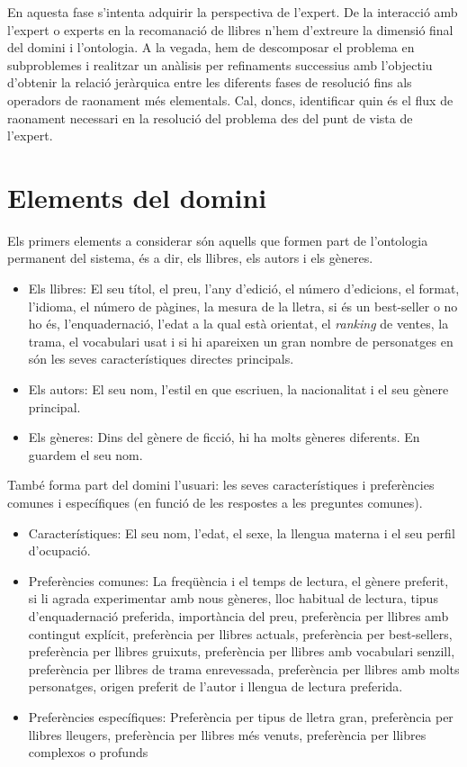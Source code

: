 
En aquesta fase s'intenta adquirir la perspectiva de l'expert. De la interacció amb l'expert o experts en la recomanació de llibres n'hem d'extreure la dimensió final del domini i l'ontologia. A  la vegada, hem de descomposar el problema en subproblemes i realitzar un anàlisis per refinaments successius amb l'objectiu d'obtenir la relació jeràrquica entre les diferents fases de resolució fins als operadors de raonament més elementals. Cal, doncs, identificar quin és el flux de raonament necessari en la resolució del problema des del punt de vista de l'expert.

\section{Elements del domini}

Els primers elements a considerar són aquells que formen part de l'ontologia permanent del sistema, és a dir, els llibres, els autors i els gèneres.
\begin{itemize}
  \item Els llibres: El seu títol, el preu, l'any d'edició, el número d'edicions, el format, l'idioma, el número de pàgines, la mesura de la lletra, si és un best-seller o no ho és, l'enquadernació, l'edat a la qual està orientat, el \emph{ranking} de ventes, la trama, el vocabulari usat i si hi apareixen un gran nombre de personatges en són les seves característiques directes principals.
  \item Els autors: El seu nom, l'estil en que escriuen, la nacionalitat i el seu gènere principal.
  \item Els gèneres: Dins del gènere de ficció, hi ha molts gèneres diferents. En guardem el seu nom.
\end{itemize}

També forma part del domini l'usuari: les seves característiques i preferències comunes i específiques (en funció de les respostes a les preguntes comunes).
\begin{itemize}
  \item Característiques: El seu nom, l'edat, el sexe, la llengua materna i el seu perfil d'ocupació.
  \item Preferències comunes: La freqüència i el temps de lectura, el gènere preferit, si li agrada experimentar amb nous gèneres, lloc habitual de lectura, tipus d'enquadernació preferida, importància del preu, preferència per llibres amb contingut explícit, preferència per llibres actuals, preferència per best-sellers, preferència per llibres gruixuts, preferència per llibres amb vocabulari senzill, preferència per llibres de trama enrevessada, preferència per llibres amb molts personatges, origen preferit de l'autor i llengua de lectura preferida.
  \item Preferències específiques: Preferència per tipus de lletra gran, preferència per llibres lleugers, preferència per llibres més venuts, preferència per llibres complexos o profunds 
\end{itemize}

